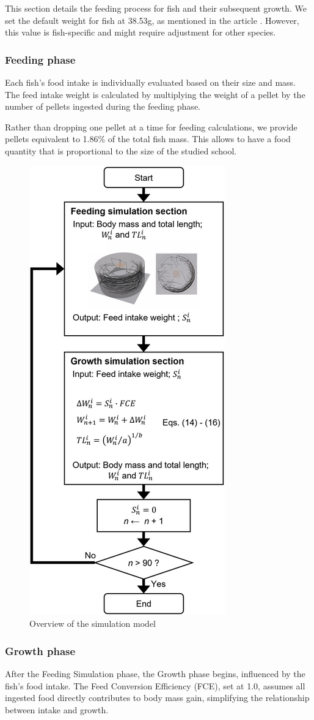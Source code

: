\documentclass[9pt]{pnas-new}
\begin{document}
This section details the feeding process for fish and their subsequent growth. We set the default weight for fish at 38.53g, as mentioned in the article \cite{morales1994effects}. However, this value is fish-specific and might require adjustment for other species.

\subsubsection{Feeding phase}
Each fish's food intake is individually evaluated based on their size and mass. The feed intake weight is calculated by multiplying the weight of a pellet by the number of pellets ingested during the feeding phase.

Rather than dropping one pellet at a time for feeding calculations, we provide pellets equivalent to 1.86\% of the total fish mass. This allows to have a food quantity that is proportional to the size of the studied school.

\begin{figure}[h]
    \centering
    \includegraphics[width=0.3\linewidth]{fig/sim.png}
    \caption{Overview of the simulation model}
    \label{fig:simulation-overview}
\end{figure}

\subsubsection{Growth phase}
After the Feeding Simulation phase, the Growth phase begins, influenced by the fish's food intake. The Feed Conversion Efficiency (FCE), set at 1.0, assumes all ingested food directly contributes to body mass gain, simplifying the relationship between intake and growth.
\end{document}
